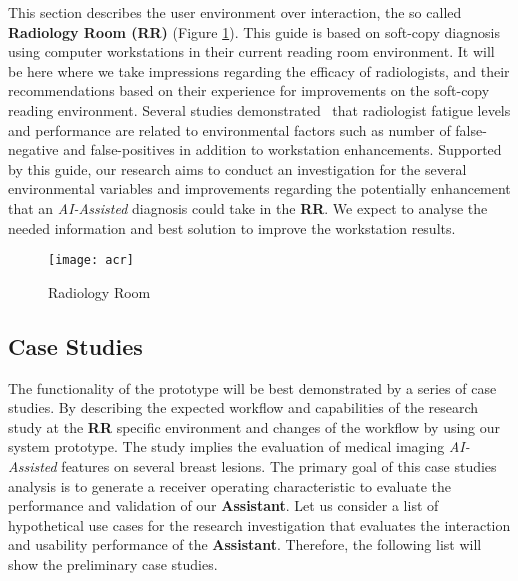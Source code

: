 This section describes the user environment over interaction, the so called \textbf{Radiology Room (RR)} (Figure \ref{fig:radioroom}). This guide is based on soft-copy diagnosis using computer workstations in their current reading room environment. It will be here where we take impressions regarding the efficacy of radiologists, and their recommendations based on their experience for improvements on the soft-copy reading environment. Several studies demonstrated~\cite{waite2017tired} that radiologist fatigue levels and performance are related to environmental factors such as number of false-negative and false-positives in addition to workstation enhancements. Supported by this guide, our research aims to conduct an investigation for the several environmental variables and improvements regarding the potentially enhancement that an \textit{AI-Assisted} diagnosis could take in the \textbf{RR}. We expect to analyse the needed information and best solution to improve the workstation results.


\hfill

\begin{figure}[h]
\centering
\texttt{[image: acr]}
\caption{Radiology Room}
\label{fig:radioroom}
\end{figure}

\hfill



\subsection{Case Studies}

The functionality of the prototype will be best demonstrated by a series of case studies. By describing the expected workflow and capabilities of the research study at the \textbf{RR} specific environment and changes of the workflow by using our system prototype. The study implies the evaluation of medical imaging \textit{AI-Assisted} features on several breast lesions. The primary goal of this case studies analysis is to generate a receiver operating characteristic to evaluate the performance and validation of our \textbf{Assistant}. Let us consider a list of hypothetical use cases for the research investigation that evaluates the interaction and usability performance of the \textbf{Assistant}. Therefore, the following list will show the preliminary case studies.


